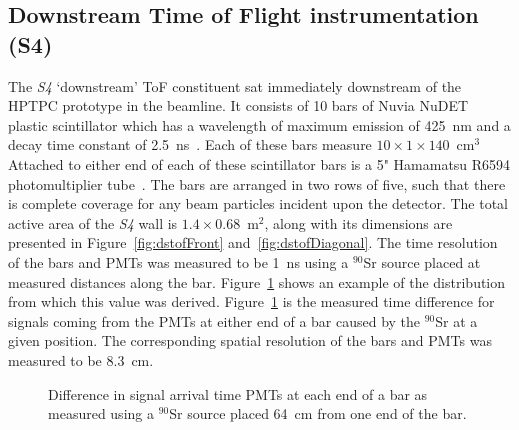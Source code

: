 \subsection{Downstream Time of Flight instrumentation (S4)}
\label{subsec:s4Exp}
The \textit{S4} `downstream' ToF constituent sat immediately downstream of the HPTPC prototype in the beamline.
It consists of 10 bars of Nuvia NuDET plastic scintillator which has a wavelength of maximum emission of 425~nm and a decay time constant of 2.5~ns~\cite{Nuvia}.
Each of these bars measure $10 \times 1 \times 140$~cm$^3$
Attached to either end of each of these scintillator bars is a 5" Hamamatsu R6594 photomultiplier tube~\cite{Hamamatsu}.
The bars are arranged in two rows of five, such that there is complete coverage for any beam particles incident upon the detector.
The total active area of the \textit{S4} wall is $1.4 \times 0.68$~m$^2$, along with its dimensions are presented in Figure~\ref{fig:dstofFront} and~\ref{fig:dstofDiagonal}.
The time resolution of the bars and PMTs was measured to be 1~ns using a $^{90}$Sr source placed at measured distances along the bar.
Figure~\ref{fig:s4Res} shows an example of the distribution from which this value was derived.
Figure~\ref{fig:s4Res} is the measured time difference for signals coming from the PMTs at either end of a bar caused by the $^{90}$Sr at a given position.
The corresponding spatial resolution of the bars and PMTs was measured to be 8.3~cm.

\begin{figure}[h]
	\begin{adjustbox}{max totalsize={.8\textwidth}{.5\textheight},center}
		
	\end{adjustbox}
	\caption{Difference in signal arrival time PMTs at each end of a bar as measured using a $^{90}$Sr source placed 64~cm from one end of the bar.}
	\label{fig:s4Res}	
\end{figure}

